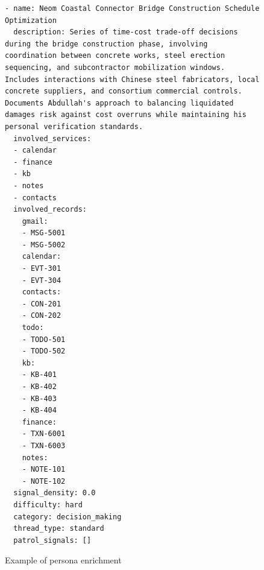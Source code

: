 \documentclass{article}
\begin{document}
\begin{figure}[htbp]
\centering
\begin{tcolorbox}[
    colback=white,           
    colframe=black!60,          
    coltitle=white,            
    colbacktitle=black!60,
    title=Persona Enrichment,    
    fonttitle=\bfseries,       
    boxrule=0.7pt,             
    arc=1mm,                   
    width=1\linewidth,      
]
\begin{lstlisting}[basicstyle=\footnotesize\ttfamily, breaklines=true]
- name: Neom Coastal Connector Bridge Construction Schedule Optimization
  description: Series of time-cost trade-off decisions during the bridge construction phase, involving coordination between concrete works, steel erection sequencing, and subcontractor mobilization windows. Includes interactions with Chinese steel fabricators, local concrete suppliers, and consortium commercial controls. Documents Abdullah's approach to balancing liquidated damages risk against cost overruns while maintaining his personal verification standards.
  involved_services:
  - calendar
  - finance
  - kb
  - notes
  - contacts
  involved_records:
    gmail:
    - MSG-5001
    - MSG-5002
    calendar:
    - EVT-301
    - EVT-304
    contacts:
    - CON-201
    - CON-202
    todo:
    - TODO-501
    - TODO-502
    kb:
    - KB-401
    - KB-402
    - KB-403
    - KB-404
    finance:
    - TXN-6001
    - TXN-6003
    notes:
    - NOTE-101
    - NOTE-102
  signal_density: 0.0
  difficulty: hard
  category: decision_making
  thread_type: standard
  patrol_signals: []
\end{lstlisting}

\end{tcolorbox}
\caption{Example of persona enrichment}
\label{fig:PersonaEnrichDemo}
\end{figure}
\end{document}
